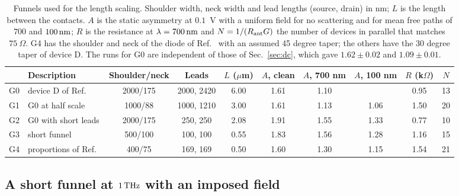 \begin{table}
\caption{Funnels used for the length scaling. Shoulder width, neck width
and lead lengths (source, drain) in nm; $L$ is the length between the
contacts. $A$ is the static asymmetry at $0.1$~V with a uniform field for
no scattering and for mean free paths of $700$ and $100\,\mathrm{nm}$; $R$ is the
resistance at $\lambda=700\,\mathrm{nm}$ and $N=1/(R_{\mathrm{ant}} G)$ the number of devices in
parallel that matches $75\ \Omega$. G4 has the shoulder and neck of the
diode of Ref.~\cite{zhu2013graphene} with an assumed 45 degree taper; the
others have the 30 degree taper of device D. The runs for G0 are
independent of those of Sec.~\ref{sec:dc}, which gave $1.62\pm0.02$ and
$1.09\pm0.01$.}
\label{tab:short}
\begin{ruledtabular}
\begin{tabular}{llcccccccc}
 & Description & Shoulder/neck & Leads & $L$ ($\mu$m) & $A$, clean & $A$, 700 nm & $A$, 100 nm & $R$ (k$\Omega$) & $N$ \\
\hline
G0 & device D of Ref.~\cite{nguyen2021geometric} & 2000/175 & 2000, 2420 & 6.00 & 1.61 & 1.10 & & 0.95 & 13 \\
G1 & G0 at half scale & 1000/88 & 1000, 1210 & 3.00 & 1.61 & 1.13 & 1.06 & 1.50 & 20 \\
G2 & G0 with short leads & 2000/175 & 250, 250 & 2.08 & 1.91 & 1.55 & 1.33 & 0.77 & 10 \\
G3 & short funnel & 500/100 & 100, 100 & 0.55 & 1.83 & 1.56 & 1.28 & 1.16 & 15 \\
G4 & proportions of Ref.~\cite{zhu2013graphene} & 400/75 & 169, 169 & 0.50 & 1.60 & 1.30 & 1.15 & 1.54 & 21 \\
\end{tabular}
\end{ruledtabular}
\end{table}

\subsection{A short funnel at $1\,\mathrm{THz}$ with an imposed field}
\label{sec:short}

